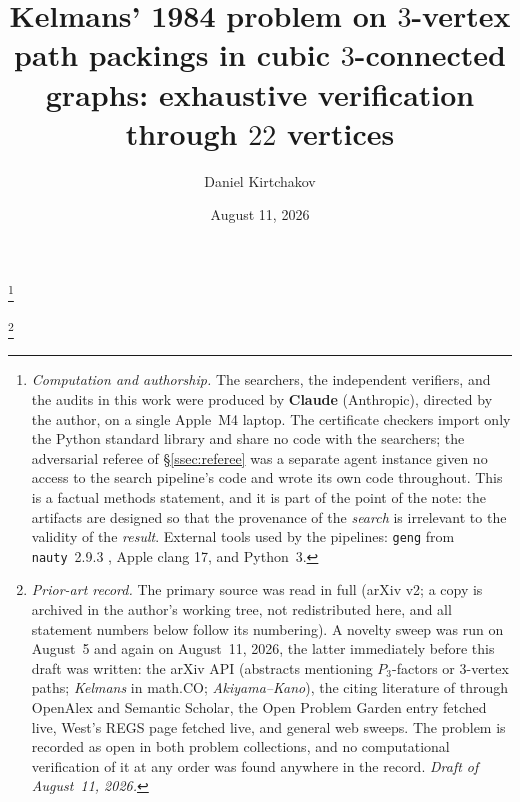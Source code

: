 \documentclass[11pt]{amsart}
\theoremstyle{plain}
\theoremstyle{definition}
\theoremstyle{remark}
\begin{document}
\title[Kelmans' 1984 problem verified through $22$ vertices]{Kelmans'
1984 problem on $3$-vertex path packings in cubic $3$-connected graphs:
exhaustive verification through $22$ vertices}

\author{Daniel Kirtchakov}
\address{Independent researcher (\texttt{05oz}); no institutional
affiliation. ORCID:
\href{https://orcid.org/0009-0009-5213-4098}{0009-0009-5213-4098}.}

\thanks{\emph{Computation and authorship.} The searchers, the independent
verifiers, and the audits in this work were produced by \textbf{Claude}
(Anthropic), directed by the author, on a single Apple~M4 laptop. The
certificate checkers import only the Python standard library and share no
code with the searchers; the adversarial referee of \S\ref{ssec:referee}
was a separate agent instance given no access to the search pipeline's
code and wrote its own code throughout. This is a factual methods
statement, and it is part of the point of the note: the artifacts are
designed so that the provenance of the \emph{search} is irrelevant to the
validity of the \emph{result}. External tools used by the pipelines:
\texttt{geng} from \texttt{nauty}~2.9.3 \cite{nauty}, Apple clang 17,
and Python~3.}

\thanks{\emph{Prior-art record.} The primary source \cite{Kel11} was read
in full (arXiv v2; a copy is archived in the author's working tree, not
redistributed here, and all
statement numbers below follow its numbering). A novelty sweep was run on
August~5 and again on August~11, 2026, the latter immediately before this
draft was written: the arXiv API (abstracts mentioning $P_3$-factors or
$3$-vertex paths; \emph{Kelmans} in math.CO; \emph{Akiyama--Kano}), the
citing literature of \cite{Kel11} through OpenAlex and Semantic Scholar,
the Open Problem Garden entry \cite{OPG} fetched live, West's REGS page
\cite{West} fetched live, and general web sweeps. The problem is recorded
as open in both problem collections, and no computational verification of
it at any order was found anywhere in the record. \emph{Draft of
August~11, 2026.}}


\date{August 11, 2026}
\end{document}
